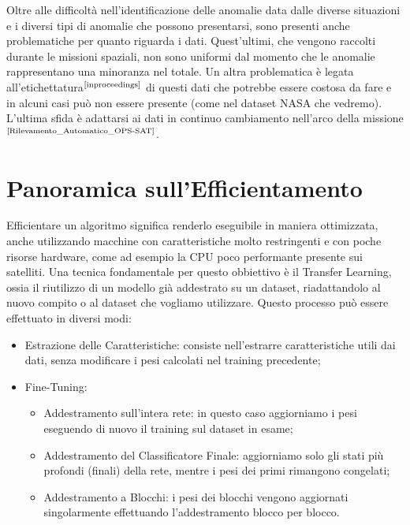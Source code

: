 Oltre alle difficoltà nell'identificazione delle anomalie data dalle diverse situazioni e i diversi tipi di anomalie che possono presentarsi, sono presenti anche problematiche per quanto riguarda i dati.
Quest'ultimi, che vengono raccolti durante le missioni spaziali, non sono uniformi dal momento che le anomalie rappresentano una minoranza nel totale.
Un altra problematica è legata all'etichettatura$^{\text{\cite{inproceedings}}}$ di questi dati che potrebbe essere costosa da fare e in alcuni casi può non essere presente (come nel dataset NASA che vedremo).
L'ultima sfida è adattarsi ai dati in continuo cambiamento nell'arco della missione$^{\text{\cite{Rilevamento_Automatico_OPS-SAT}}}$.

\section{Panoramica sull'Efficientamento}
Efficientare un algoritmo significa renderlo eseguibile in maniera ottimizzata, anche utilizzando macchine con caratteristiche molto restringenti e con poche risorse hardware, come ad esempio la CPU poco performante presente sui satelliti.
Una tecnica fondamentale per questo obbiettivo è il Transfer Learning, ossia il riutilizzo di un modello già addestrato su un dataset, riadattandolo al nuovo compito o al dataset che vogliamo utilizzare. Questo processo può essere effettuato in diversi modi:
\begin{itemize}
    \item Estrazione delle Caratteristiche: consiste nell'estrarre caratteristiche utili dai dati, senza modificare i pesi calcolati nel training precedente;
    \item Fine-Tuning:
    \begin{itemize}
        \item Addestramento sull'intera rete: in questo caso aggiorniamo i pesi eseguendo di nuovo il training sul dataset in esame;
        \item Addestramento del Classificatore Finale: aggiorniamo solo gli stati più profondi (finali) della rete, mentre i pesi dei primi rimangono congelati;
        \item Addestramento a Blocchi: i pesi dei blocchi vengono aggiornati singolarmente effettuando l'addestramento blocco per blocco.
    \end{itemize}   
\end{itemize}

